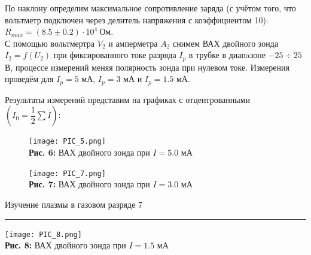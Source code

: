 \documentclass[12pt,a4paper]{scrartcl}
\begin{document}
По наклону определим максимальное сопротивление заряда (с учётом того, что вольтметр подключен через делитель напряжения с коэффициентом 10): $R_{max} = (8.5\pm 0.2)\cdot 10^4~\text{Ом}$.\\
С помощью вольтмертра $V_2$ и амперметра $A_2$ снимем ВАХ двойного зонда $I_2 = f(U_2)$ при фиксированного токе разряда $I_p$ в трубке в диапaзоне $-25 \div 25$ В, процессе измерений меняя полярность зонда при нулевом токе. Измерения проведём для $I_p = 5$ мА, $I_p = 3$ мА  и $I_p = 1.5$ мА.

Результаты измерений представим на графиках с отцентрованными $\left(I_0 = \dfrac{1}{2}\sum I\right)$:

\begin{figure}[h]
\begin{minipage}{0.5\linewidth}
\begin{center}
\texttt{[image: PIC\_5.png]}
\\\textbf{Рис. 6:} ВАХ двойного зонда при $I = 5.0$ мА
\end{center}
\end{minipage}
\begin{minipage}{0.5\linewidth}
\begin{center}
\texttt{[image: PIC\_7.png]}
\\\textbf{Рис. 7:} ВАХ двойного зонда при $I = 3.0$ мА

\end{center}
\end{minipage}
\end{figure}

\newpage


	\begin{flushleft}
		\footnotesize{Изучение плазмы в газовом разряде} \hspace{\fill} \footnotesize{7}
		\\[-0.3cm]\noindent\rule{\textwidth}{0.3pt}
	\end{flushleft}	

\begin{center}
\texttt{[image: PIC\_8.png]}
\\\textbf{Рис. 8:} ВАХ двойного зонда при $I = 1.5$ мА

\end{center}
\end{document}
